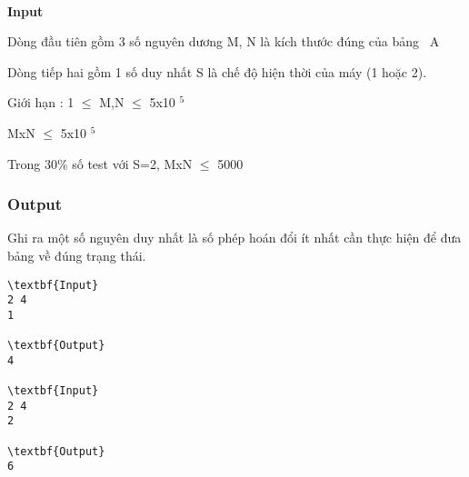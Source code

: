 \\\textbf{Input }\textbf{}

Dòng đầu tiên gồm 3 số nguyên dương M, N là kích thước đúng của bảng  A

Dòng tiếp hai gồm 1 số duy nhất S là chế độ hiện thời của máy (1 hoặc 2).

Giới hạn : 1  $\le$  M,N  $\le$  5x10 $^ 5 $

MxN  $\le$  5x10 $^ 5 $

Trong 30\% số test với S=2, MxN  $\le$  5000

\subsubsection{Output}

Ghi ra một số nguyên duy nhất là số phép hoán đổi ít nhất cần thực hiện để đưa bảng về đúng trạng thái.
\begin{verbatim}
\textbf{Input}
2 4
1

\textbf{Output}
4

\textbf{Input}
2 4
2

\textbf{Output}
6\end{verbatim}
